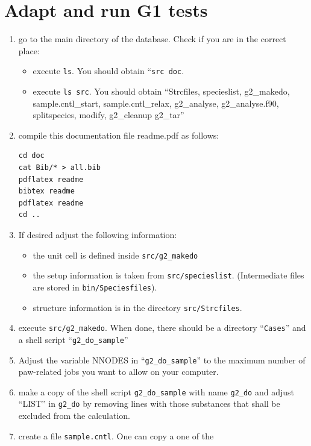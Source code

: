 \documentclass{book}
\begin{document}
\section*{Adapt and run G1 tests}
\begin{enumerate}
\item go to the main directory of the database. Check if you are in
  the correct place:
  \begin{itemize} 
    \item execute \verb|ls|. You should obtain ``\verb|src doc|. 
    \item execute \verb|ls src|. You should obtain ``Strcfiles,
      specieslist, g2\_makedo, sample.cntl\_start,
      sample.cntl\_relax, g2\_analyse, g2\_analyse.f90, splitspecies, 
      modify, g2\_cleanup g2\_tar''
   \end{itemize}
%
\item compile this documentation file readme.pdf as follows:
\begin{verbatim}
cd doc
cat Bib/* > all.bib
pdflatex readme
bibtex readme
pdflatex readme
cd ..
\end{verbatim}
%
\item If desired adjust the following information:
  \begin{itemize}
     \item the unit cell is defined inside \verb|src/g2_makedo|
     \item the setup information is taken from \verb|src/specieslist|.
          (Intermediate files are stored in \verb|bin/Speciesfiles|).
     \item structure information is in the directory \verb|src/Strcfiles|.
  \end{itemize}
%
\item execute \verb|src/g2_makedo|. When done, there should be a
  directory ``\verb|Cases|'' and a shell script ``\verb|g2_do_sample|''
%
\item Adjust the variable NNODES in ``\verb|g2_do_sample|'' to the
  maximum number of paw-related jobs you want to allow on your
  computer.
%
\item make a copy of the shell script \verb|g2_do_sample| with name
  \verb|g2_do| and adjust ``LIST'' in \verb|g2_do| by removing lines
  with those substances that shall be excluded from the calculation.
%
\item create a file \verb|sample.cntl|. One can copy a one of the

\end{enumerate}
\end{document}
